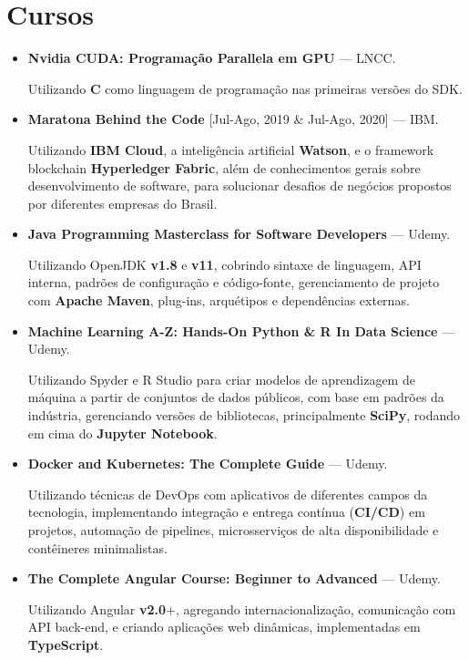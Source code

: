 \section{Cursos}

\begin{itemize}
  \item \textbf{Nvidia CUDA: Programação Parallela em GPU} --- LNCC.

    Utilizando \textbf{C} como linguagem de programação nas primeiras
    versões do SDK.

  \item \textbf{Maratona Behind the Code} {[Jul-Ago, 2019 \& Jul-Ago, 2020]} --- IBM.

    Utilizando \textbf{IBM Cloud}, a inteligência artificial \textbf{Watson},
    e o framework blockchain \textbf{Hyperledger Fabric}, além de conhecimentos
    gerais sobre desenvolvimento de software, para solucionar desafios de negócios
    propostos por diferentes empresas do Brasil.

  \item \textbf{Java Programming Masterclass for Software Developers} --- Udemy.

    Utilizando OpenJDK \textbf{v1.8} e \textbf{v11}, cobrindo sintaxe de
    linguagem, API interna, padrões de configuração e código-fonte,
    gerenciamento de projeto com \textbf{Apache Maven}, plug-ins, arquétipos
    e dependências externas.

  \item \textbf{Machine Learning A-Z\texttrademark: Hands-On Python \& R In Data
    Science} --- Udemy.

    Utilizando Spyder e R Studio para criar modelos de aprendizagem de
    máquina a partir de conjuntos de dados públicos, com base em padrões
    da indústria, gerenciando versões de bibliotecas, principalmente
    \textbf{SciPy}, rodando em cima do \textbf{Jupyter Notebook}.

  \item \textbf{Docker and Kubernetes: The Complete Guide} --- Udemy.

    Utilizando técnicas de DevOps com aplicativos de diferentes campos
    da tecnologia, implementando integração e entrega contínua
    (\textbf{CI/CD}) em projetos, automação de pipelines, microsserviços
    de alta disponibilidade e contêineres minimalistas.

  \item \textbf{The Complete Angular Course: Beginner to Advanced} --- Udemy.

    Utilizando Angular \textbf{v2.0}+, agregando internacionalização,
    comunicação com API back-end, e criando aplicações web dinâmicas,
    implementadas em \textbf{TypeScript}.

\end{itemize}
